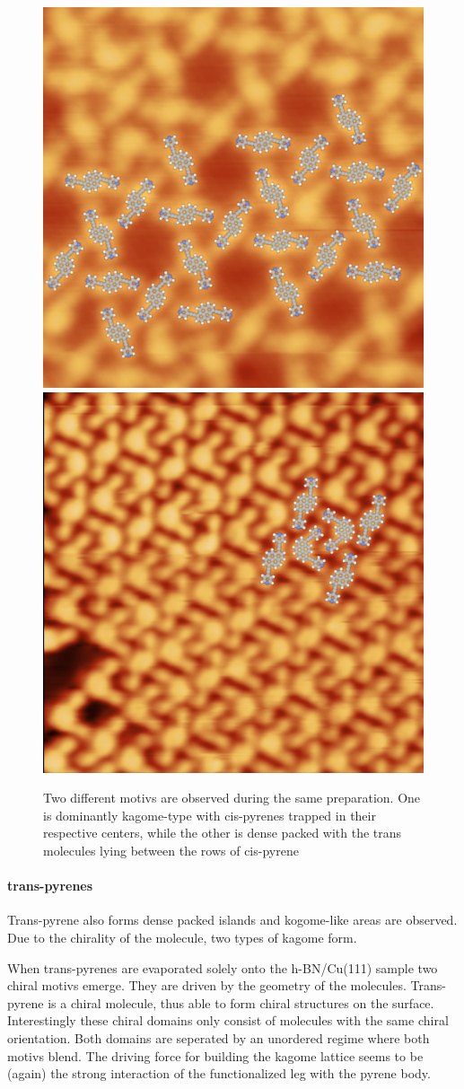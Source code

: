 \begin{figure}[!h]
\centering
 \includegraphics[height=0.4\textwidth]{./images/F160628-143559-model.png}
 \includegraphics[height=0.4\textwidth]{./images/F160628-163557-model.png}
 \caption{Two different motivs are observed during the same preparation. One is dominantly kagome-type with cis-pyrenes trapped in their respective centers, while the other is dense packed with the trans molecules lying between the rows of cis-pyrene} 
\label{pic:1+2}
 \end{figure}

\paragraph {trans-pyrenes}
Trans-pyrene also forms dense packed islands and kogome-like areas are observed. Due to the chirality of the molecule, two types of kagome form.

When trans-pyrenes are evaporated solely onto the h-BN/Cu(111) sample two chiral motivs emerge. They are driven by the geometry of the molecules. Trans-pyrene is a chiral molecule, thus able to form chiral structures on the surface. Interestingly these chiral domains only consist of molecules with the same chiral orientation. Both domains are seperated by an unordered regime where both motivs blend. The driving force for building the kagome lattice seems to be (again) the strong interaction of the functionalized leg with the pyrene body. 

